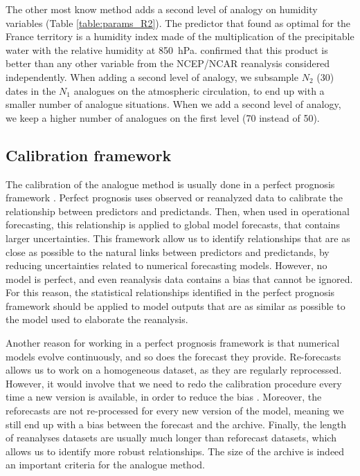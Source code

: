 \documentclass[twocol]{ametsoc}
\begin{document}
The other most know method adds a second level of analogy on humidity variables (Table \ref{table:params_R2}). The predictor that \citet{Bontron2004} found as optimal for the France territory is a humidity index made of the multiplication of the precipitable water with the relative humidity at 850~hPa. \cite{Horton2012a} confirmed that this product is better than any other variable from the NCEP/NCAR reanalysis considered independently. When adding a second level of analogy, we subsample $N_{2}$ (30) dates in the $N_{1}$ analogues on the atmospheric circulation, to end up with a smaller number of analogue situations. When we add a second level of analogy, we keep a higher number of analogues on the first level (70 instead of 50).


\subsection{Calibration framework}

The calibration of the analogue method is usually done in a perfect prognosis \citep{Klein1959} framework \citep{BenDaoud2010, Bontron2004}. Perfect prognosis uses observed or reanalyzed data to calibrate the relationship between predictors and predictands. Then, when used in operational forecasting, this relationship is applied to global model forecasts, that contains larger uncertainties. This framework allow us to identify relationships that are as close as possible to the natural links between predictors and predictands, by reducing uncertainties related to numerical forecasting models. However, no model is perfect, and even reanalysis data contains a bias that cannot be ignored. For this reason, the statistical relationships identified in the perfect prognosis framework should be applied to model outputs that are as similar as possible to the model used to elaborate the reanalysis. 

Another reason for working in a perfect prognosis framework is that numerical models evolve continuously, and so does the forecast they provide. Re-forecasts allows us to work on a homogeneous dataset, as they are regularly reprocessed. However, it would involve that we need to redo the calibration procedure every time a new version is available, in order to reduce the bias \citep{Wilson2002}. Moreover, the reforecasts are not re-processed for every new version of the model, meaning we still end up with a bias between the forecast and the archive. Finally, the length of reanalyses datasets are usually much longer than reforecast datasets, which allows us to identify more robust relationships. The size of the archive is indeed an important criteria for the analogue method.
\end{document}
